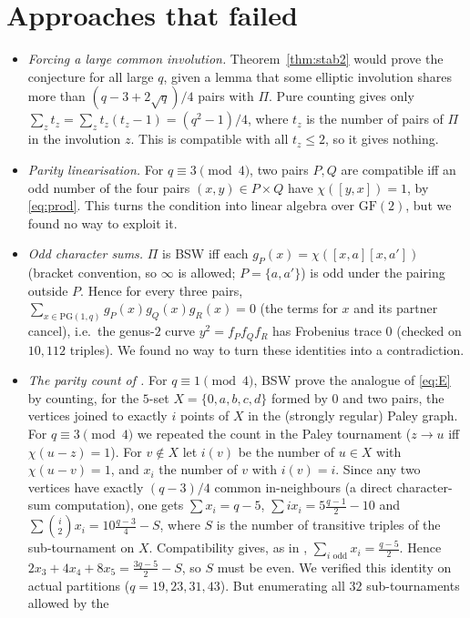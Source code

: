 \documentclass[11pt,a4paper]{article}
\theoremstyle{definition}
\theoremstyle{remark}
\newcommand{\GF}{\mathrm{GF}}
\newcommand{\PG}{\mathrm{PG}}
\begin{document}
\section{Approaches that failed}\label{sec:failed}

\begin{itemize}
\item \emph{Forcing a large common involution.} Theorem~\ref{thm:stab2} would prove the conjecture for all
large $q$, given a lemma that some elliptic involution shares more than $(q-3+2\sqrt q)/4$ pairs with $\Pi$. Pure
counting gives only $\sum_z t_z=\sum_z t_z(t_z-1)=(q^2-1)/4$, where $t_z$ is the number of pairs of $\Pi$ in the
involution $z$. This is compatible with all $t_z\le2$, so it gives nothing.
\item \emph{Parity linearisation.} For $q\equiv3\pmod4$, two pairs $P,Q$ are compatible iff an odd number of the four
pairs $(x,y)\in P\times Q$ have $\chi([y,x])=1$, by \eqref{eq:prod}. This turns the condition into linear algebra over
$\GF(2)$, but we found no way to exploit it.
\item \emph{Odd character sums.} $\Pi$ is BSW iff each $g_P(x)=\chi([x,a][x,a'])$ (bracket convention, so
$\infty$ is allowed; $P=\{a,a'\}$) is odd under the pairing
outside $P$. Hence for every three pairs, $\sum_{x\in\PG(1,q)}g_P(x)g_Q(x)g_R(x)=0$ (the terms for $x$ and its partner cancel),
i.e.\ the genus-$2$ curve $y^2=f_Pf_Qf_R$ has Frobenius trace $0$ (checked on $10{,}112$ triples). We found no way to turn these identities into a contradiction.
\item \emph{The parity count of \cite{BSW}.} For $q\equiv1\pmod4$, BSW prove the analogue of \eqref{eq:E} by counting,
for the $5$-set $X=\{0,a,b,c,d\}$ formed by $0$ and two pairs, the vertices joined to exactly $i$ points of $X$ in the
(strongly regular) Paley graph. For $q\equiv3\pmod4$ we repeated the count in the Paley tournament ($z\to u$ iff
$\chi(u-z)=1$). For $v\notin X$ let $i(v)$ be the number of $u\in X$ with $\chi(u-v)=1$, and $x_i$ the number of $v$
with $i(v)=i$. Since any two vertices have exactly $(q-3)/4$ common in-neighbours (a direct character-sum
computation), one gets $\sum x_i=q-5$, $\sum ix_i=5\frac{q-1}2-10$ and $\sum\binom i2x_i=10\frac{q-3}4-S$, where $S$ is the
number of transitive triples of the sub-tournament on $X$. Compatibility gives, as in \cite{BSW}, $\sum_{i\text{ odd}}x_i=
\frac{q-5}2$. Hence $2x_3+4x_4+8x_5=\frac{3q-5}2-S$, so $S$ must be even. We verified this identity on actual partitions
($q=19,23,31,43$). But enumerating all $32$ sub-tournaments allowed by the

\end{itemize}
\end{document}
